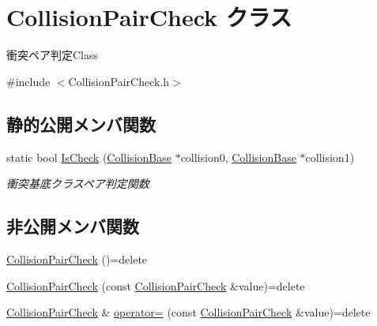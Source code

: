 \hypertarget{class_collision_pair_check}{}\section{Collision\+Pair\+Check クラス}
\label{class_collision_pair_check}


衝突ペア判定\+Class  




{\ttfamily \#include $<$Collision\+Pair\+Check.\+h$>$}

\subsection*{静的公開メンバ関数}
\begin{DoxyCompactItemize}
\item 
static bool \mbox{\hyperlink{class_collision_pair_check_aa7603c32ae782ad890280d360ae19dfe}{Is\+Check}} (\mbox{\hyperlink{class_collision_base}{Collision\+Base}} $\ast$collision0, \mbox{\hyperlink{class_collision_base}{Collision\+Base}} $\ast$collision1)
\begin{DoxyCompactList}\small\item\em 衝突基底クラスペア判定関数 \end{DoxyCompactList}\end{DoxyCompactItemize}
\subsection*{非公開メンバ関数}
\begin{DoxyCompactItemize}
\item 
\mbox{\hyperlink{class_collision_pair_check_a1b4609489f79e7f272e97d15893339b5}{Collision\+Pair\+Check}} ()=delete
\item 
\mbox{\hyperlink{class_collision_pair_check_a61d81de67fb69218a54dd1224ef30eee}{Collision\+Pair\+Check}} (const \mbox{\hyperlink{class_collision_pair_check}{Collision\+Pair\+Check}} \&value)=delete
\item 
\mbox{\hyperlink{class_collision_pair_check}{Collision\+Pair\+Check}} \& \mbox{\hyperlink{class_collision_pair_check_a32ebe7303801a6bfa9225c60ddb4b749}{operator=}} (const \mbox{\hyperlink{class_collision_pair_check}{Collision\+Pair\+Check}} \&value)=delete
\end{DoxyCompactItemize}
